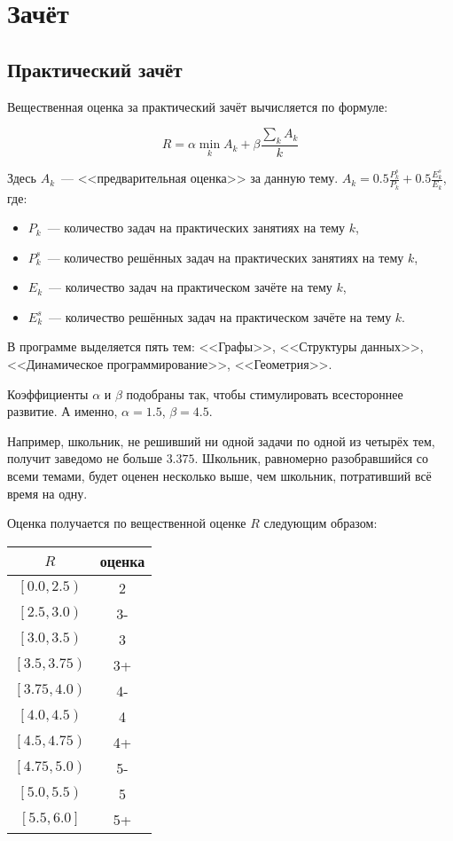 \documentclass[a4paper,12pt]{article}
\begin{document}
  \section{Зачёт}

  \subsection{Практический зачёт}

  Вещественная оценка за практический зачёт вычисляется по формуле:

  $$ R = \alpha \min_{k}{A_k} + \beta \frac{\sum_k{A_k}}{k} $$

  Здесь $A_k$~--- <<предварительная оценка>> за данную тему.
  $A_k = 0.5 \frac{P^s_k}{P_k} + 0.5 \frac{E^s_k}{E_k}$, где:
  \begin{itemize}
    \item $P_k$~--- количество задач на практических занятиях
      на тему $k$,
    \item $P^s_k$~--- количество решённых задач на практических
      занятиях на тему $k$,
    \item $E_k$~--- количество задач на практическом зачёте
      на тему $k$,
    \item $E^s_k$~--- количество решённых задач на практическом
      зачёте на тему $k$.
  \end{itemize}

  В программе выделяется пять тем: <<Графы>>, <<Структуры данных>>,
  <<Динамическое программирование>>, <<Геометрия>>.

  Коэффициенты $\alpha$ и $\beta$ подобраны так, чтобы стимулировать
  всестороннее развитие. А именно, $\alpha = 1.5$, $\beta = 4.5$.

  Например, школьник, не решивший ни одной задачи по одной из четырёх
  тем, получит заведомо не больше $3.375$. Школьник, равномерно
  разобравшийся
  со всеми темами, будет оценен несколько выше, чем школьник,
  потративший всё время на одну.

  Оценка получается по вещественной оценке $R$ следующим образом:

  \begin{center}
  \begin{tabular}{|c|c|}
    \hline
    $R$ & оценка \\
    \hline
    $\left[0.0, 2.5\right)$ & 2 \\
    \hline
    $\left[2.5, 3.0\right)$ & 3- \\
    \hline
    $\left[3.0, 3.5\right)$ & 3 \\
    \hline
    $\left[3.5, 3.75\right)$ & 3+ \\
    \hline
    $\left[3.75, 4.0\right)$ & 4- \\
    \hline
    $\left[4.0, 4.5\right)$ & 4 \\
    \hline
    $\left[4.5, 4.75\right)$ & 4+ \\
    \hline
    $\left[4.75, 5.0\right)$ & 5- \\
    \hline
    $\left[5.0, 5.5\right)$ & 5 \\
    \hline
    $\left[5.5, 6.0\right]$ & 5+ \\
    \hline
  \end{tabular}
  \end{center}
\end{document}
